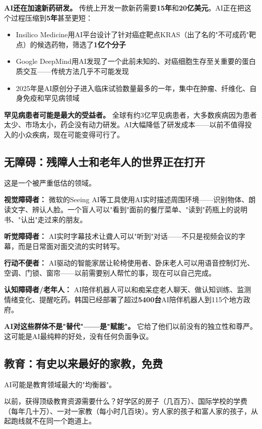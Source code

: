 \documentclass[a4paper,12pt,UTF8]{ctexart}
\begin{document}
\textbf{AI还在加速新药研发。} 传统上开发一款新药需要\textbf{15年}和\textbf{20亿美元}。AI正在把这个过程压缩到\textbf{5年}甚至更短：
\begin{itemize}
\item Insilico Medicine用AI平台设计了针对癌症靶点KRAS（出了名的"不可成药"靶点）的候选药物，筛选了\textbf{1亿个分子}
\item Google DeepMind用AI发现了一个此前未知的、对癌细胞生存至关重要的蛋白质交互——传统方法几乎不可能发现
\item 2025年是AI原创分子进入临床试验数量最多的一年，集中在肿瘤、纤维化、自身免疫和罕见病领域
\end{itemize}

\textbf{罕见病患者可能是最大的受益者。} 全球有约3亿罕见病患者，大多数疾病因为患者太少、市场太小，药企没有动力研发。AI大幅降低了研发成本——以前不值得投入的小众疾病，现在可能变得可行了。

\subsection{无障碍：残障人士和老年人的世界正在打开}

这是一个被严重低估的领域。

\textbf{视觉障碍者：} 微软的Seeing AI等工具使用AI实时描述周围环境——识别物体、朗读文字、辨认人脸。一个盲人可以"看到"面前的餐厅菜单、"读到"药瓶上的说明书、"认出"走过来的朋友。

\textbf{听觉障碍者：} AI实时字幕技术让聋人可以"听到"对话——不只是视频会议的字幕，而是日常面对面交流的实时转写。

\textbf{行动不便者：} AI驱动的智能家居让轮椅使用者、卧床老人可以用语音控制灯光、空调、门锁、窗帘——以前需要别人帮忙的事，现在可以自己完成。

\textbf{认知障碍者/老年人：} AI陪伴机器人可以和痴呆症老人聊天、做认知训练、监测情绪变化、提醒吃药。韩国已经部署了超过\textbf{5400台}AI陪伴机器人到115个地方政府。

\textbf{AI对这些群体不是"替代"——是"赋能"。} 它给了他们以前没有的独立性和尊严。这可能是AI最纯粹的好处，没有任何负面争议。

\subsection{教育：有史以来最好的家教，免费}

AI可能是教育领域最大的"均衡器"。

以前，获得顶级教育资源需要什么？好学区的房子（几百万）、国际学校的学费（每年几十万）、一对一家教（每小时几百块）。穷人家的孩子和富人家的孩子，从起跑线就不在同一个跑道上。
\end{document}
